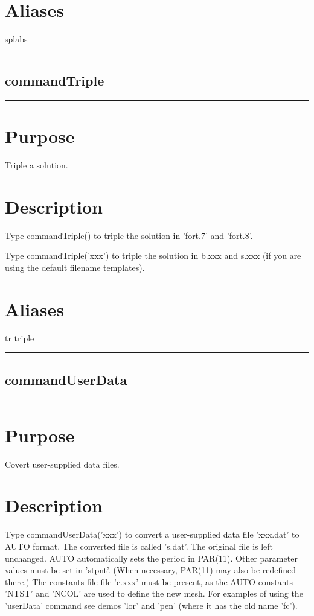 \documentclass[12pt]{report}
\begin{document}
\begin{minipage}{6in}
    \section*{Aliases}
splabs \medskip\hrule\end{minipage}\subsection{commandTriple} \label{sec:clui_ref_commandTriple}\begin{minipage}{6in}\hrule\medskip\section*{Purpose}
Triple a solution.\section*{Description}

    Type commandTriple() to triple the solution in 'fort.7' and 'fort.8'.

    Type commandTriple('xxx') to triple the solution in b.xxx and s.xxx (if you
    are using the default filename templates).
    \section*{Aliases}
tr triple \medskip\hrule\end{minipage}\subsection{commandUserData} \label{sec:clui_ref_commandUserData}\begin{minipage}{6in}\hrule\medskip\section*{Purpose}
Covert user-supplied data files.\section*{Description}

    Type commandUserData('xxx') to convert a user-supplied data file 'xxx.dat' to
    AUTO format. The converted file is called 's.dat'.  The original
    file is left unchanged.  AUTO automatically sets the period in
    PAR(11).  Other parameter values must be set in 'stpnt'. (When
    necessary, PAR(11) may also be redefined there.)  The
    constants-file file 'c.xxx' must be present, as the AUTO-constants
    'NTST' and 'NCOL' are used to define the new mesh.  For examples
    of using the 'userData' command see demos 'lor' and 'pen' (where
    it has the old name 'fc').

\end{minipage}
\end{document}
